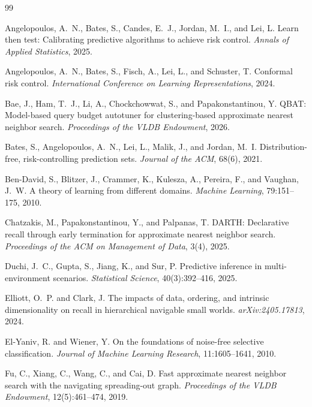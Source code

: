 \documentclass{article}
\begin{document}
\begin{thebibliography}{99}
\itemsep0pt

Angelopoulos, A.~N., Bates, S., Candes, E.~J., Jordan, M.~I., and Lei, L.
Learn then test: Calibrating predictive algorithms to achieve risk control.
\emph{Annals of Applied Statistics}, 2025.

Angelopoulos, A.~N., Bates, S., Fisch, A., Lei, L., and Schuster, T.
Conformal risk control.
\emph{International Conference on Learning Representations}, 2024.

Bae, J., Ham, T.~J., Li, A., Chockchowwat, S., and Papakonstantinou, Y.
QBAT: Model-based query budget autotuner for clustering-based approximate nearest neighbor search.
\emph{Proceedings of the VLDB Endowment}, 2026.

Bates, S., Angelopoulos, A.~N., Lei, L., Malik, J., and Jordan, M.~I.
Distribution-free, risk-controlling prediction sets.
\emph{Journal of the ACM}, 68(6), 2021.

Ben-David, S., Blitzer, J., Crammer, K., Kulesza, A., Pereira, F., and Vaughan, J.~W.
A theory of learning from different domains.
\emph{Machine Learning}, 79:151--175, 2010.

Chatzakis, M., Papakonstantinou, Y., and Palpanas, T.
DARTH: Declarative recall through early termination for approximate nearest neighbor search.
\emph{Proceedings of the ACM on Management of Data}, 3(4), 2025.

Duchi, J.~C., Gupta, S., Jiang, K., and Sur, P.
Predictive inference in multi-environment scenarios.
\emph{Statistical Science}, 40(3):392--416, 2025.

Elliott, O.~P. and Clark, J.
The impacts of data, ordering, and intrinsic dimensionality on recall in hierarchical navigable small
worlds. \emph{arXiv:2405.17813}, 2024.

El-Yaniv, R. and Wiener, Y.
On the foundations of noise-free selective classification.
\emph{Journal of Machine Learning Research}, 11:1605--1641, 2010.

Fu, C., Xiang, C., Wang, C., and Cai, D.
Fast approximate nearest neighbor search with the navigating spreading-out graph.
\emph{Proceedings of the VLDB Endowment}, 12(5):461--474, 2019.


\end{thebibliography}
\end{document}
